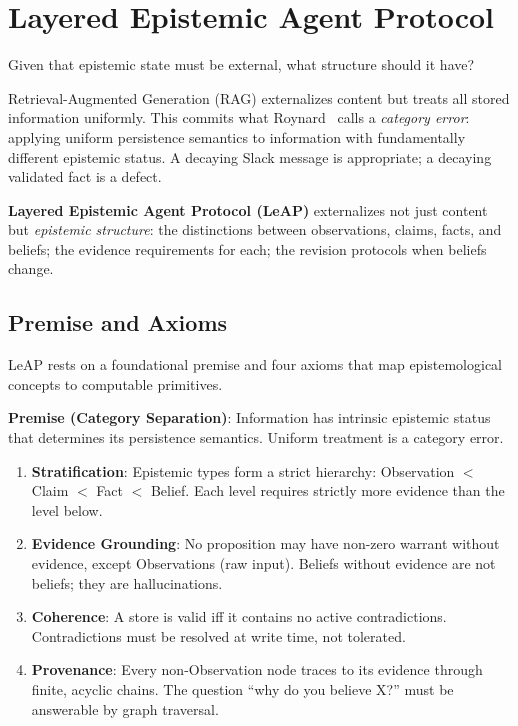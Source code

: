 \documentclass[11pt,letterpaper]{article}
\begin{document}
\section{Layered Epistemic Agent Protocol}
\label{sec:leap}

Given that epistemic state must be external, what structure should it have?

Retrieval-Augmented Generation (RAG) externalizes content but treats all stored information uniformly. This commits what Roynard~\cite{roynard2026} calls a \textit{category error}: applying uniform persistence semantics to information with fundamentally different epistemic status. A decaying Slack message is appropriate; a decaying validated fact is a defect.

\textbf{Layered Epistemic Agent Protocol (LeAP)} externalizes not just content but \textit{epistemic structure}: the distinctions between observations, claims, facts, and beliefs; the evidence requirements for each; the revision protocols when beliefs change.

\subsection{Premise and Axioms}

LeAP rests on a foundational premise and four axioms that map epistemological concepts to computable primitives.

\textbf{Premise (Category Separation)}: Information has intrinsic epistemic status that determines its persistence semantics. Uniform treatment is a category error.

\begin{enumerate}[noitemsep]
    \item[\textbf{A1}] \textbf{Stratification}: Epistemic types form a strict hierarchy: Observation $<$ Claim $<$ Fact $<$ Belief. Each level requires strictly more evidence than the level below.

    \item[\textbf{A2}] \textbf{Evidence Grounding}: No proposition may have non-zero warrant without evidence, except Observations (raw input). Beliefs without evidence are not beliefs; they are hallucinations.

    \item[\textbf{A3}] \textbf{Coherence}: A store is valid iff it contains no active contradictions. Contradictions must be resolved at write time, not tolerated.

    \item[\textbf{A4}] \textbf{Provenance}: Every non-Observation node traces to its evidence through finite, acyclic chains. The question ``why do you believe X?'' must be answerable by graph traversal.
\end{enumerate}
\end{document}
